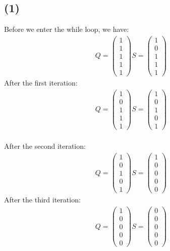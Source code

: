 \documentclass[a4paper, fleqn]{article}
\begin{document}
\subsection*{(1)}
Before we enter the while loop, we have:
\begin{align*}
  Q=\begin{pmatrix}
  1 \\
  1 \\
  1 \\
  1 \\
  1
  \end{pmatrix}
  S =\begin{pmatrix}
  1 \\
  0 \\
  1 \\
  1 \\
  1
  \end{pmatrix}
\end{align*}
After the first iteration:
\begin{align*}
  Q=\begin{pmatrix}
  1 \\
  0 \\
  1 \\
  1 \\
  1
  \end{pmatrix}
  S =\begin{pmatrix}
  1 \\
  0 \\
  1 \\
  0 \\
  1
  \end{pmatrix}
\end{align*}\\
After the second iteration:
\begin{align*}
  Q=\begin{pmatrix}
  1 \\
  0 \\
  1 \\
  0 \\
  1
  \end{pmatrix}
  S =\begin{pmatrix}
  1 \\
  0 \\
  0 \\
  0 \\
  0
  \end{pmatrix}
\end{align*}
After the third iteration:
\begin{align*}
  Q=\begin{pmatrix}
  1 \\
  0 \\
  0 \\
  0 \\
  0
  \end{pmatrix}
  S =\begin{pmatrix}
  0 \\
  0 \\
  0 \\
  0 \\
  0
  \end{pmatrix}
\end{align*}
\end{document}

